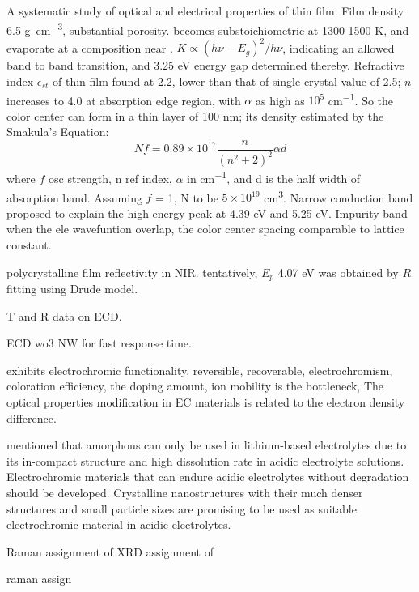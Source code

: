 A systematic study of optical and electrical properties of  thin film.\cite{Deb1973} Film density 6.5 \si{g\per cm^3}, substantial porosity.  becomes substoichiometric at 1300-1500 K, and evaporate at a composition near . $K \propto (h\nu - E_g)^2/h\nu$, indicating an allowed band to band transition, and 3.25 eV energy gap determined thereby. Refractive index $\epsilon_{st}$ of thin film  found at 2.2, lower than that of single crystal value of 2.5; $n$ increases to 4.0 at absorption edge region, with $\alpha$ as high as $10^5$ \si{cm^{-1}}. So the color center can form in a thin layer of 100 nm; its density estimated by the Smakula's Equation:
\[
Nf = 0.89\times10^17\frac{n}{(n^2+2)^2} \alpha d
\]
where $f$ osc strength, n ref index, $\alpha$ in \si{cm^{-1}}, and d is the half width of absorption band. Assuming $f$ = 1, N to be $5\times10^{19}$ \si{cm^3}. 
Narrow conduction band proposed to explain the high energy peak at 4.39 eV and 5.25 eV. Impurity band when the ele wavefuntion overlap, the color center spacing comparable to lattice constant. 


polycrystalline  film reflectivity in NIR.\cite{Goldner1983} tentatively,  $E_p$ 4.07 eV was obtained by $R$ fitting using Drude model. 

T and R data on ECD. \cite{OBrien1999}

ECD wo3 NW for fast response time. \cite{Liao2006a}


exhibits electrochromic functionality. reversible, recoverable, electrochromism, 
coloration efficiency, the doping amount, 
ion mobility is the bottleneck, 
The optical properties modification in EC materials is related to the electron density difference. 


\citeauthor{Wang2009a} mentioned that amorphous  can only be used in lithium-based electrolytes due to its in-compact structure and high dissolution rate in acidic electrolyte solutions. Electrochromic materials that can endure acidic electrolytes without degradation should be developed. Crystalline  nanostructures with their much denser structures and small particle sizes are promising to be used as suitable electrochromic material in acidic electrolytes.

Raman assignment of 
XRD assignment of 

raman assign




